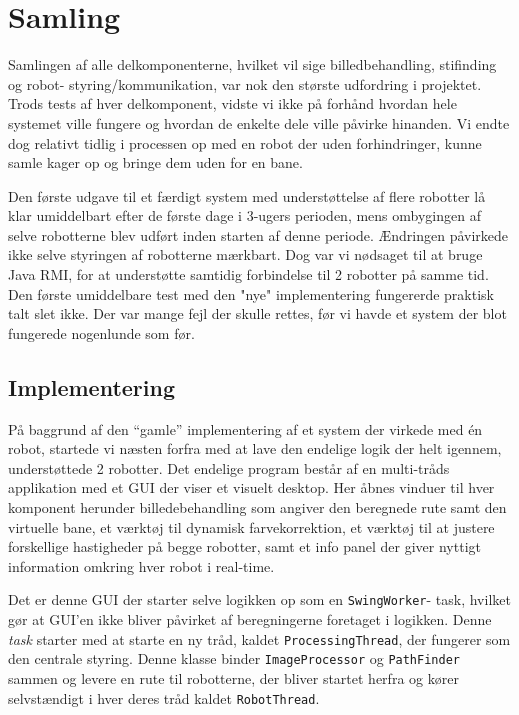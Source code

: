 \chapter{Samling}
Samlingen af alle delkomponenterne, hvilket vil sige billedbehandling, stifinding og robot- styring/kommunikation, var nok den største udfordring i projektet. Trods tests af hver delkomponent, vidste vi ikke på forhånd hvordan hele systemet ville fungere og hvordan de enkelte dele ville påvirke hinanden. Vi endte dog relativt tidlig i processen op med en robot der uden forhindringer, kunne samle kager op og bringe dem uden for en bane.

Den første udgave til et færdigt system med understøttelse af flere robotter lå klar umiddelbart efter de første dage i 3-ugers perioden, mens ombygingen af selve robotterne blev udført inden starten af denne periode. Ændringen påvirkede ikke selve styringen af robotterne mærkbart. Dog var vi nødsaget til at bruge Java RMI, for at understøtte samtidig forbindelse til 2 robotter på samme tid. Den første umiddelbare test med den "nye" implementering fungererde praktisk talt slet ikke. Der var mange fejl der skulle rettes, før vi havde et system der blot fungerede nogenlunde som før.

\section{Implementering}
På baggrund af den "`gamle"' implementering af et system der virkede med én robot, startede vi næsten forfra med at lave den endelige logik der helt igennem, understøttede 2 robotter.
Det endelige program består af en multi-tråds applikation med et GUI der viser et visuelt desktop. Her åbnes vinduer til hver komponent herunder billedebehandling som angiver den beregnede rute samt den virtuelle bane, et værktøj til dynamisk farvekorrektion, et værktøj til at justere forskellige hastigheder på begge robotter, samt et info panel der giver nyttigt information omkring hver robot i real-time.

Det er denne GUI der starter selve logikken op som en \texttt{SwingWorker}- task, hvilket gør at GUI’en ikke bliver påvirket af beregningerne foretaget i logikken. Denne \textit{task} starter med at starte en ny tråd, kaldet \texttt{ProcessingThread}, der fungerer som den centrale styring. Denne klasse binder \texttt{ImageProcessor} og \texttt{PathFinder} sammen og levere en rute til robotterne, der bliver startet herfra og kører selvstændigt i hver deres tråd kaldet \texttt{RobotThread}.

